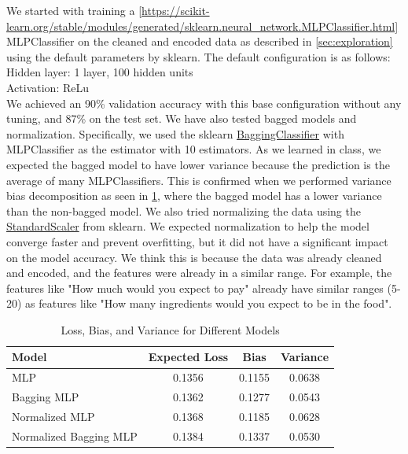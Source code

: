 We started with training a \ref{https://scikit-learn.org/stable/modules/generated/sklearn.neural_network.MLPClassifier.html}{MLPClassifier}
 on the cleaned and encoded data as described in \ref{sec:exploration} using the default parameters by
sklearn.
The default configuration is as follows:\\
Hidden layer: 1 layer, 100 hidden units\\
Activation: ReLu\\
We achieved an 90\% validation accuracy with this base configuration without any tuning, and 87\% on the test set.
We have also tested bagged models and normalization. Specifically, we used the sklearn \href{https://scikit-learn.org/stable/modules/generated/sklearn.ensemble.BaggingClassifier.html}{BaggingClassifier}
with MLPClassifier as the estimator with 10 estimators. As we learned in class, we expected the bagged model to have lower variance because the prediction is the average of many MLPClassifiers.
This is confirmed when we performed variance bias decomposition as seen in \ref{tab:nn_bias_var}, where the bagged model has a lower variance than the non-bagged model.
We also tried normalizing the data using the \href{https://scikit-learn.org/stable/modules/generated/sklearn.preprocessing.StandardScaler.html}{StandardScaler} from sklearn.
We expected normalization to help the model converge faster and prevent overfitting, but it did not have a significant impact on the model accuracy.
We think this is because the data was already cleaned and encoded, and the features were already in a similar range.
For example, the features like "How much would you expect to pay" already have similar ranges (5-20) as features like "How many ingredients would you expect to be in the food".

\begin{table}[ht]
    \centering
    \begin{tabular}{lccc}
        \hline
        Model                  & Expected Loss & Bias   & Variance \\
        \hline
        MLP                    & 0.1356        & 0.1155 & 0.0638   \\
        Bagging MLP            & 0.1362        & 0.1277 & 0.0543   \\
        Normalized MLP         & 0.1368        & 0.1185 & 0.0628   \\
        Normalized Bagging MLP & 0.1384        & 0.1337 & 0.0530   \\
        \hline
    \end{tabular}
    \caption{Loss, Bias, and Variance for Different Models}
    \label{tab:nn_bias_var}
\end{table}

